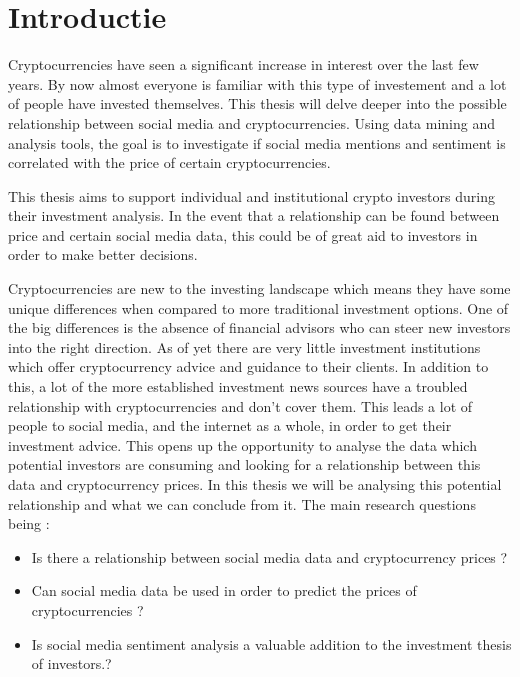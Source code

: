 
\section{Introductie}%
\label{sec:introductie}

\noindent Cryptocurrencies have seen a significant increase in interest over the last few years. By now almost everyone is familiar with this type of investement and a lot of people have invested themselves. This thesis will delve deeper into the possible relationship between social media and cryptocurrencies. Using data mining and analysis tools, the goal is to investigate if social media mentions and sentiment is correlated with the price of certain cryptocurrencies.  

\noindent This thesis aims to support individual and institutional crypto investors during their investment analysis. In the event that a relationship can be found between price and certain social media data, this could be of great aid to investors in order to make better decisions. 

\noindent Cryptocurrencies are new to the investing landscape which means they have some unique differences when compared to more traditional investment options. One of the big differences is the absence of financial advisors who can steer new investors into the right direction. As of yet there are very little investment institutions which offer cryptocurrency advice and guidance to their clients. In addition to this, a lot of the more established investment news sources have a troubled relationship with cryptocurrencies and don't cover them. This leads a lot of people to social media, and the internet as a whole, in order to get their investment advice. This opens up the opportunity to analyse the data which potential investors are consuming and looking for a relationship between this data and cryptocurrency prices. In this thesis we will be analysing this potential relationship and what we can conclude from it. The main research questions being :

\begin{itemize}
    \item Is there a relationship between social media data and cryptocurrency prices ?
    \item Can social media data be used in order to predict the prices of cryptocurrencies ?
    \item Is social media sentiment analysis a valuable addition to the investment thesis of investors.?
\end{itemize}



